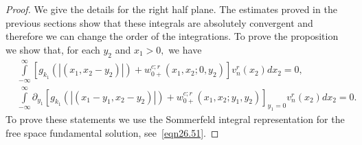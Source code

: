 \documentclass[10pt,a4paper]{amsart}
\newcommand\pa{\partial}
\begin{document}
\begin{proof}
  We give the details for the right half plane. The estimates proved in the
  previous sections show that these integrals are absolutely convergent and
  therefore we can change the order of the integrations. To prove the
  proposition we show that, for each $y_2$ and $x_1>0,$ we have
   \begin{equation}\label{eqn212.93} 
    \begin{split}
     &\int\limits_{-\infty}^{\infty}[g_{k_1}(|(x_1,x_2-y_2)|)+
        w^{c;r}_{0+}(x_1,x_2;0,y_2)]v_n^{r}(x_2)dx_2=0,\\
     &\int\limits_{-\infty}^{\infty}\pa_{y_1}[g_{k_1}(|(x_1-y_1,x_2-y_2)|)+
        w^{c;r}_{0+}(x_1,x_2;y_1,y_2)]_{y_1=0}v_n^{r}(x_2)dx_2=0.
    \end{split}
  \end{equation}
  To prove these statements we use the Sommerfeld integral representation for
  the free space fundamental solution, see~\eqref{eqn26.51}.


\end{proof}
\end{document}
